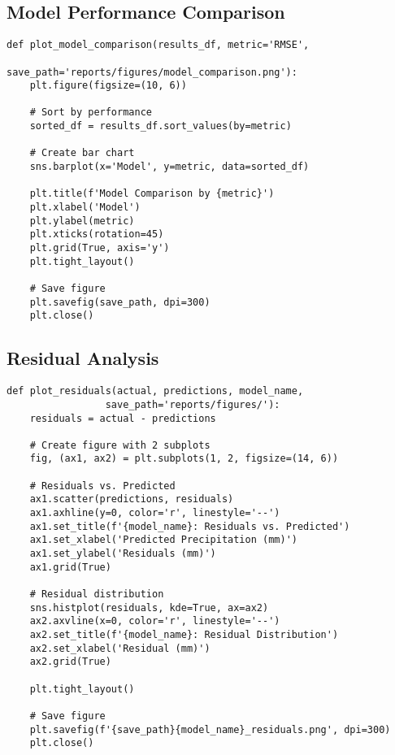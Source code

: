 \documentclass[12pt]{article}
\begin{document}
\subsection{Model Performance Comparison}
\label{subsec:performance_comparison}

\begin{verbatim}
def plot_model_comparison(results_df, metric='RMSE', 
                        save_path='reports/figures/model_comparison.png'):
    plt.figure(figsize=(10, 6))
    
    # Sort by performance
    sorted_df = results_df.sort_values(by=metric)
    
    # Create bar chart
    sns.barplot(x='Model', y=metric, data=sorted_df)
    
    plt.title(f'Model Comparison by {metric}')
    plt.xlabel('Model')
    plt.ylabel(metric)
    plt.xticks(rotation=45)
    plt.grid(True, axis='y')
    plt.tight_layout()
    
    # Save figure
    plt.savefig(save_path, dpi=300)
    plt.close()
\end{verbatim}

\subsection{Residual Analysis}
\label{subsec:residual_analysis}

\begin{verbatim}
def plot_residuals(actual, predictions, model_name, 
                 save_path='reports/figures/'):
    residuals = actual - predictions
    
    # Create figure with 2 subplots
    fig, (ax1, ax2) = plt.subplots(1, 2, figsize=(14, 6))
    
    # Residuals vs. Predicted
    ax1.scatter(predictions, residuals)
    ax1.axhline(y=0, color='r', linestyle='--')
    ax1.set_title(f'{model_name}: Residuals vs. Predicted')
    ax1.set_xlabel('Predicted Precipitation (mm)')
    ax1.set_ylabel('Residuals (mm)')
    ax1.grid(True)
    
    # Residual distribution
    sns.histplot(residuals, kde=True, ax=ax2)
    ax2.axvline(x=0, color='r', linestyle='--')
    ax2.set_title(f'{model_name}: Residual Distribution')
    ax2.set_xlabel('Residual (mm)')
    ax2.grid(True)
    
    plt.tight_layout()
    
    # Save figure
    plt.savefig(f'{save_path}{model_name}_residuals.png', dpi=300)
    plt.close()
\end{verbatim}
\end{document}
